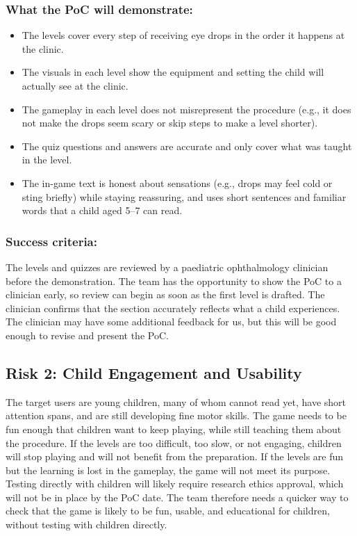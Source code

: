 \documentclass{article}
\begin{document}
\subsubsection*{What the PoC will demonstrate:}
\begin{itemize}
  \item The levels cover every step of receiving eye drops in the order it
  happens at the clinic.
  \item The visuals in each level show the equipment and setting the child
  will actually see at the clinic.
  \item The gameplay in each level does not misrepresent the procedure (e.g., it
  does not make the drops seem scary or skip steps to make a level shorter).
  \item The quiz questions and answers are accurate and only cover what was
  taught in the level.
  \item The in-game text is honest about sensations (e.g., drops may feel cold
  or sting briefly) while staying reassuring, and uses short sentences and
  familiar words that a child aged 5--7 can read.
\end{itemize}

\subsubsection*{Success criteria:}
The levels and quizzes are reviewed by a paediatric ophthalmology clinician
before the demonstration. The team has the opportunity to show the PoC to a
clinician early, so review can begin as soon as the first level is drafted. The
clinician confirms that the section accurately reflects what a child
experiences. The clinician may have some additional feedback for us, but this
will be good enough to revise and present the PoC.

\subsection{Risk 2: Child Engagement and Usability}

The target users are young children, many of whom cannot read yet, have short
attention spans, and are still developing fine motor skills. The game needs to
be fun enough that children want to keep playing, while still teaching them
about the procedure. If the levels are too difficult, too slow, or not
engaging, children will stop playing and will not benefit from the preparation.
If the levels are fun but the learning is lost in the gameplay, the game will
not meet its purpose. Testing directly with children will likely require
research ethics approval, which will not be in place by the PoC date. The team
therefore needs a quicker way to check that the game is likely to be fun,
usable, and educational for children, without testing with children directly.
\end{document}
